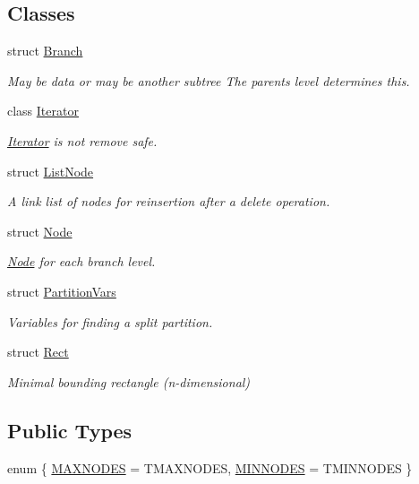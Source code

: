 \subsection*{\-Classes}
\begin{DoxyCompactItemize}
\item 
struct \hyperlink{struct_r_tree_1_1_branch}{\-Branch}
\begin{DoxyCompactList}\small\item\em \-May be data or may be another subtree \-The parents level determines this. \end{DoxyCompactList}\item 
class \hyperlink{class_r_tree_1_1_iterator}{\-Iterator}
\begin{DoxyCompactList}\small\item\em \hyperlink{class_r_tree_1_1_iterator}{\-Iterator} is not remove safe. \end{DoxyCompactList}\item 
struct \hyperlink{struct_r_tree_1_1_list_node}{\-List\-Node}
\begin{DoxyCompactList}\small\item\em \-A link list of nodes for reinsertion after a delete operation. \end{DoxyCompactList}\item 
struct \hyperlink{struct_r_tree_1_1_node}{\-Node}
\begin{DoxyCompactList}\small\item\em \hyperlink{struct_r_tree_1_1_node}{\-Node} for each branch level. \end{DoxyCompactList}\item 
struct \hyperlink{struct_r_tree_1_1_partition_vars}{\-Partition\-Vars}
\begin{DoxyCompactList}\small\item\em \-Variables for finding a split partition. \end{DoxyCompactList}\item 
struct \hyperlink{struct_r_tree_1_1_rect}{\-Rect}
\begin{DoxyCompactList}\small\item\em \-Minimal bounding rectangle (n-\/dimensional) \end{DoxyCompactList}\end{DoxyCompactItemize}
\subsection*{\-Public \-Types}
\begin{DoxyCompactItemize}
\item 
enum \{ \hyperlink{class_r_tree_afaccb2e611f17ff46b623771ad7043d7ac05afe446df73fa67991e5199453a37f}{\-M\-A\-X\-N\-O\-D\-E\-S} =  \-T\-M\-A\-X\-N\-O\-D\-E\-S, 
\hyperlink{class_r_tree_afaccb2e611f17ff46b623771ad7043d7a3be3d8c82fd5bfbd5e5a496e9877d71a}{\-M\-I\-N\-N\-O\-D\-E\-S} =  \-T\-M\-I\-N\-N\-O\-D\-E\-S
 \}
\end{DoxyCompactItemize}
